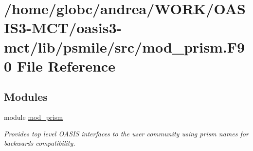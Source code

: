 \hypertarget{mod__prism_8_f90}{}\section{/home/globc/andrea/\+W\+O\+R\+K/\+O\+A\+S\+I\+S3-\/\+M\+C\+T/oasis3-\/mct/lib/psmile/src/mod\+\_\+prism.F90 File Reference}
\label{mod__prism_8_f90}
\subsection*{Modules}
\begin{DoxyCompactItemize}
\item 
module \hyperlink{namespacemod__prism}{mod\+\_\+prism}
\begin{DoxyCompactList}\small\item\em Provides top level O\+A\+S\+IS interfaces to the user community using prism names for backwards compatibility. \end{DoxyCompactList}\end{DoxyCompactItemize}
